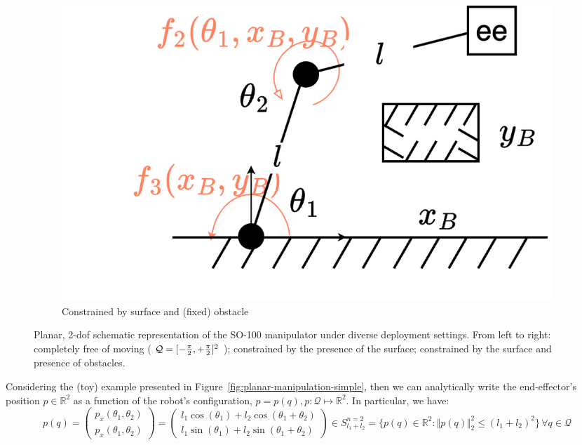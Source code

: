 \begin{figure}
\begin{subfigure}[t]{0.32\linewidth}
    \end{subfigure}\hfill
    \begin{subfigure}[t]{0.32\linewidth}
        \centering
        \includegraphics[width=\linewidth,height=\panelheight,keepaspectratio]{figures/ch2/ch2-planar-manipulator-floor-shelf.png}
        \caption{Constrained by surface and (fixed) obstacle}
        \label{fig:planar-manipulator-floor-shelf}
    \end{subfigure}
    \caption{Planar, 2-dof schematic representation of the SO-100 manipulator under diverse deployment settings. From left to right: completely free of moving ( \( \mathcal Q = [-\frac{\pi}{2}, +\frac{\pi}{2}]^2 \) ); constrained by the presence of the surface; constrained by the surface and presence of obstacles.}
\end{figure}

Considering the (toy) example presented in Figure~\ref{fig:planar-manipulation-simple}, then we can analytically write the end-effector's position \( p \in \mathbb R^2 \) as a function of the robot's configuration, \( p = p(q), p: \mathcal Q \mapsto \mathbb R^2 \). 
In particular, we have:
\begin{equation*}
p(q) = 
\begin{pmatrix}
p_x(\theta_1, \theta_2) \\  
p_x(\theta_1, \theta_2)
\end{pmatrix}
=
\begin{pmatrix}
l_1 \cos(\theta_1) + l_2 \cos(\theta_1 + \theta_2) \\
l_1 \sin(\theta_1) + l_2 \sin(\theta_1 + \theta_2)
\end{pmatrix}
\in S^{n=2}_{l_1+l_2} = \{ p(q) \in \mathbb R^2: \Vert p(q) \Vert_2^2 \leq (l_1+l_2)^2 \} \, \forall q \in \mathcal Q
\end{equation*}

